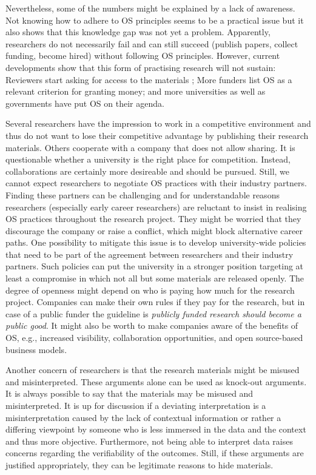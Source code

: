 \documentclass[gc, manuscript]{copernicus}
\begin{document}
Nevertheless, some of the numbers might be explained by a lack of
awareness. Not knowing how to adhere to OS principles seems to be a
practical issue but it also shows that this knowledge gap was not yet a
problem. Apparently, researchers do not necessarily fail and can still
succeed (publish papers, collect funding, become hired) without
following OS principles. However, current developments show that this
form of practising research will not sustain: Reviewers start asking for
access to the materials \citep{stark2018before}; More funders list OS as
a relevant criterion for granting money; and more universities as well
as governments have put OS on their agenda.

Several researchers have the impression to work in a competitive
environment and thus do not want to lose their competitive advantage by
publishing their research materials. Others cooperate with a company
that does not allow sharing. It is questionable whether a university is
the right place for competition. Instead, collaborations are certainly
more desireable and should be pursued. Still, we cannot expect
researchers to negotiate OS practices with their industry partners.
Finding these partners can be challenging and for understandable reasons
researchers (especially early career researchers) are reluctant to
insist in realising OS practices throughout the research project. They
might be worried that they discourage the company or raise a conflict,
which might block alternative career paths. One possibility to mitigate
this issue is to develop university-wide policies that need to be part
of the agreement between researchers and their industry partners. Such
policies can put the university in a stronger position targeting at
least a compromise in which not all but some materials are released
openly. The degree of openness might depend on who is paying how much
for the research project. Companies can make their own rules if they pay
for the research, but in case of a public funder the guideline is
\textit{publicly funded research should become a public good}. It might
also be worth to make companies aware of the benefits of OS, e.g.,
increased visibility, collaboration opportunities, and open source-based
business models.

Another concern of researchers is that the research materials might be
misused and misinterpreted. These arguments alone can be used as
knock-out arguments. It is always possible to say that the materials may
be misused and misinterpreted. It is up for discussion if a deviating
interpretation is a misinterpretation caused by the lack of contextual
information or rather a differing viewpoint by someone who is less
immersed in the data and the context and thus more objective.
Furthermore, not being able to interpret data raises concerns regarding
the verifiability of the outcomes. Still, if these arguments are
justified appropriately, they can be legitimate reasons to hide
materials.
\end{document}
